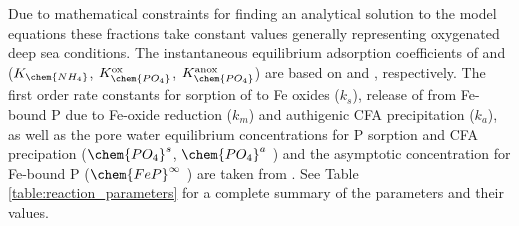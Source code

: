 \documentclass[gmd, manuscript]{copernicus}
\begin{document}
Due to mathematical constraints for finding an analytical solution to the model equations these fractions take constant values generally representing oxygenated deep sea conditions. 
The instantaneous equilibrium adsorption coefficients of  and  ($K_{\chem{NH_4}}$, $K_\chem{PO_4}^{\mathrm{ox}}$, $K_\chem{PO_4}^{\mathrm{anox}}$) are based on \citet{wang_multicomponent_1996} and \citet{slomp1998role}, respectively.
The first order rate constants for sorption of  to Fe oxides ($k_s$), release of  from Fe-bound P due to Fe-oxide reduction ($k_m$) and 
authigenic CFA precipitation ($k_a$), as well as the pore water equilibrium concentrations for P sorption and CFA precipation 
($\chem{PO_4}^s$, $\chem{PO_4}^a$ ) and the asymptotic concentration for Fe-bound P ($\chem{FeP}^\infty$ ) are taken from  \citet{caroline_p_slomp_key_1996}. 
See Table \ref{table:reaction_parameters} for a complete summary of the parameters and their values.

\end{document}
